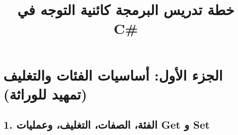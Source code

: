 \documentclass[14pt]{extarticle}
\title{خطة تدريس البرمجة كائنية التوجه في \textenglish{C\#}}
\begin{document}
\maketitle
\thispagestyle{fancy}

\section*{الجزء الأول: أساسيات الفئات والتغليف (تمهيد للوراثة)}

\subsection*{1. الفئة، الصفات، التغليف، وعمليات \textenglish{Get} و \textenglish{Set}}
\end{document}
